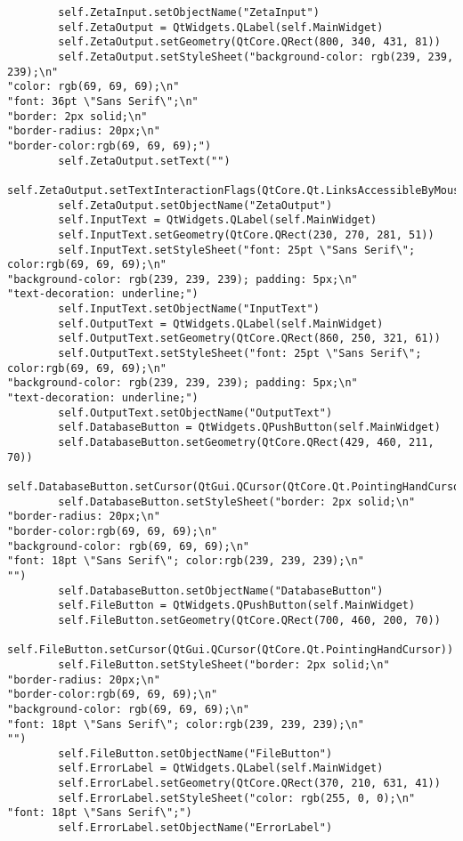 \documentclass{article}
\begin{document}
\begin{lstlisting}
        self.ZetaInput.setObjectName("ZetaInput")
        self.ZetaOutput = QtWidgets.QLabel(self.MainWidget)
        self.ZetaOutput.setGeometry(QtCore.QRect(800, 340, 431, 81))
        self.ZetaOutput.setStyleSheet("background-color: rgb(239, 239, 239);\n"
"color: rgb(69, 69, 69);\n"
"font: 36pt \"Sans Serif\";\n"
"border: 2px solid;\n"
"border-radius: 20px;\n"
"border-color:rgb(69, 69, 69);")
        self.ZetaOutput.setText("")
        self.ZetaOutput.setTextInteractionFlags(QtCore.Qt.LinksAccessibleByMouse|QtCore.Qt.TextSelectableByKeyboard|QtCore.Qt.TextSelectableByMouse)
        self.ZetaOutput.setObjectName("ZetaOutput")
        self.InputText = QtWidgets.QLabel(self.MainWidget)
        self.InputText.setGeometry(QtCore.QRect(230, 270, 281, 51))
        self.InputText.setStyleSheet("font: 25pt \"Sans Serif\"; color:rgb(69, 69, 69);\n"
"background-color: rgb(239, 239, 239); padding: 5px;\n"
"text-decoration: underline;")
        self.InputText.setObjectName("InputText")
        self.OutputText = QtWidgets.QLabel(self.MainWidget)
        self.OutputText.setGeometry(QtCore.QRect(860, 250, 321, 61))
        self.OutputText.setStyleSheet("font: 25pt \"Sans Serif\"; color:rgb(69, 69, 69);\n"
"background-color: rgb(239, 239, 239); padding: 5px;\n"
"text-decoration: underline;")
        self.OutputText.setObjectName("OutputText")
        self.DatabaseButton = QtWidgets.QPushButton(self.MainWidget)
        self.DatabaseButton.setGeometry(QtCore.QRect(429, 460, 211, 70))
        self.DatabaseButton.setCursor(QtGui.QCursor(QtCore.Qt.PointingHandCursor))
        self.DatabaseButton.setStyleSheet("border: 2px solid;\n"
"border-radius: 20px;\n"
"border-color:rgb(69, 69, 69);\n"
"background-color: rgb(69, 69, 69);\n"
"font: 18pt \"Sans Serif\"; color:rgb(239, 239, 239);\n"
"")
        self.DatabaseButton.setObjectName("DatabaseButton")
        self.FileButton = QtWidgets.QPushButton(self.MainWidget)
        self.FileButton.setGeometry(QtCore.QRect(700, 460, 200, 70))
        self.FileButton.setCursor(QtGui.QCursor(QtCore.Qt.PointingHandCursor))
        self.FileButton.setStyleSheet("border: 2px solid;\n"
"border-radius: 20px;\n"
"border-color:rgb(69, 69, 69);\n"
"background-color: rgb(69, 69, 69);\n"
"font: 18pt \"Sans Serif\"; color:rgb(239, 239, 239);\n"
"")
        self.FileButton.setObjectName("FileButton")
        self.ErrorLabel = QtWidgets.QLabel(self.MainWidget)
        self.ErrorLabel.setGeometry(QtCore.QRect(370, 210, 631, 41))
        self.ErrorLabel.setStyleSheet("color: rgb(255, 0, 0);\n"
"font: 18pt \"Sans Serif\";")
        self.ErrorLabel.setObjectName("ErrorLabel")

\end{lstlisting}
\end{document}
